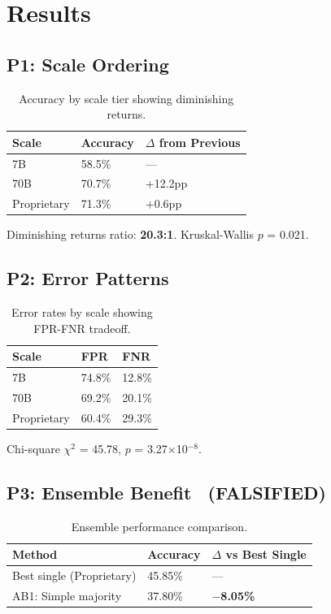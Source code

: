 \section{Results}

\subsection{P1: Scale Ordering \checkmark}

\begin{table}[h]
\centering
\begin{tabular}{@{}lll@{}}
\toprule
Scale & Accuracy & $\Delta$ from Previous \\
\midrule
7B & 58.5\% & --- \\
70B & 70.7\% & +12.2pp \\
Proprietary & 71.3\% & +0.6pp \\
\bottomrule
\end{tabular}
\caption{Accuracy by scale tier showing diminishing returns.}
\label{tab:scale}
\end{table}

Diminishing returns ratio: \textbf{20.3:1}. Kruskal-Wallis $p$ = 0.021.

\subsection{P2: Error Patterns \checkmark}

\begin{table}[h]
\centering
\begin{tabular}{@{}lll@{}}
\toprule
Scale & FPR & FNR \\
\midrule
7B & 74.8\% & 12.8\% \\
70B & 69.2\% & 20.1\% \\
Proprietary & 60.4\% & 29.3\% \\
\bottomrule
\end{tabular}
\caption{Error rates by scale showing FPR-FNR tradeoff.}
\label{tab:errors}
\end{table}

Chi-square $\chi^2$ = 45.78, $p$ = 3.27$\times$10$^{-8}$.

\subsection{P3: Ensemble Benefit \texttimes\ (FALSIFIED)}

\begin{table}[h]
\centering
\begin{tabular}{@{}lll@{}}
\toprule
Method & Accuracy & $\Delta$ vs Best Single \\
\midrule
Best single (Proprietary) & 45.85\% & --- \\
AB1: Simple majority & 37.80\% & \textbf{$-$8.05\%} \\
\bottomrule
\end{tabular}
\caption{Ensemble performance comparison.}
\label{tab:ensemble}
\end{table}

